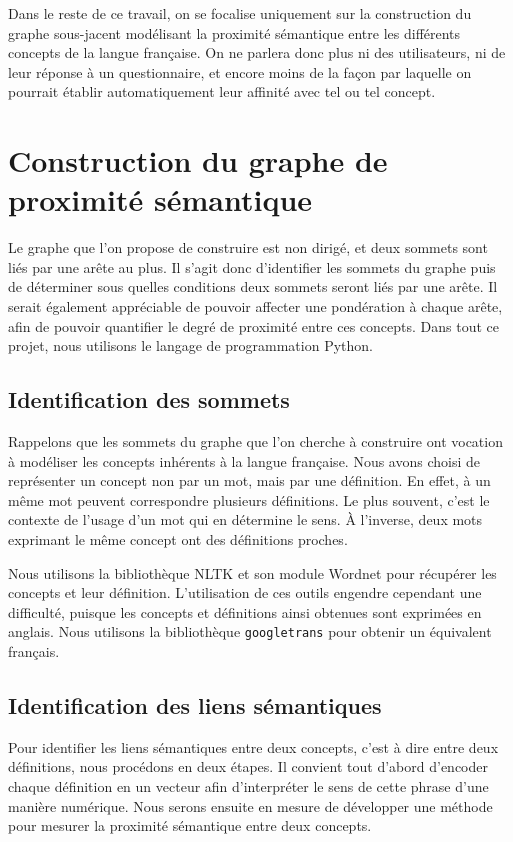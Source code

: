 \documentclass{amsart}
\begin{document}
Dans le reste de ce travail, on se focalise uniquement sur la construction du graphe sous-jacent modélisant la proximité sémantique entre les différents concepts de la langue française. On ne parlera donc plus ni des utilisateurs, ni de leur réponse à un questionnaire, et encore moins de la façon par laquelle on pourrait établir automatiquement leur affinité avec tel ou tel concept.

\section{Construction du graphe de proximité sémantique}

Le graphe que l'on propose de construire est non dirigé, et deux sommets sont liés par une arête au plus. Il s'agit donc d'identifier les sommets du graphe puis de déterminer sous quelles conditions deux sommets seront liés par une arête. Il serait également appréciable de pouvoir affecter une pondération à chaque arête, afin de pouvoir quantifier le degré de proximité entre ces concepts. Dans tout ce projet, nous utilisons le langage de programmation Python.

\subsection{Identification des sommets}
Rappelons que les sommets du graphe que l'on cherche à construire ont vocation à modéliser les concepts inhérents à la langue française. Nous avons choisi de représenter un concept non par un mot, mais par une définition. En effet, à un même mot peuvent correspondre plusieurs définitions. Le plus souvent, c'est le contexte de l'usage d'un mot qui en détermine le sens. À l'inverse, deux mots exprimant le même concept ont des définitions proches.

Nous utilisons la bibliothèque NLTK \cite{loper2002nltk} et son module Wordnet \cite{fellbaum2010wordnet} pour récupérer les concepts et leur définition. L'utilisation de ces outils engendre cependant une difficulté, puisque les concepts et définitions ainsi obtenues sont exprimées en anglais. Nous utilisons la bibliothèque \verb|googletrans| pour obtenir un équivalent français.

\subsection{Identification des liens sémantiques}
Pour identifier les liens sémantiques entre deux concepts, c'est à dire entre deux définitions, nous procédons en deux étapes. Il convient tout d'abord d'encoder chaque définition en un vecteur afin d'interpréter le sens de cette phrase d'une manière numérique. Nous serons ensuite en mesure de développer une méthode pour mesurer la proximité sémantique entre deux concepts. 
\end{document}
